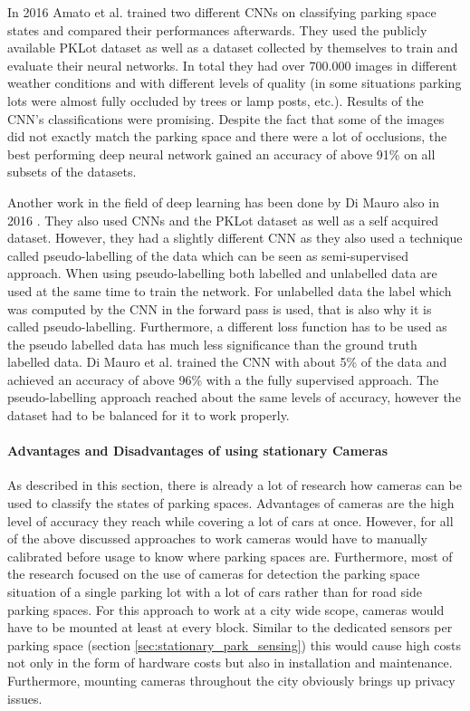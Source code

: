 In 2016 Amato et al. \cite{Amato2016} trained two different CNNs on classifying parking space states and compared their performances afterwards. They used the publicly available PKLot dataset as well as a dataset collected by themselves to train and evaluate their neural networks. In total they had over 700.000 images in different weather conditions and with different levels of quality (in some situations parking lots were almost fully occluded by trees or lamp posts, etc.). Results of the CNN's classifications were promising. Despite the fact that some of the images did not exactly match the parking space and there were a lot of occlusions, the best performing deep neural network gained an accuracy of above 91\% on all subsets of the datasets. 

Another work in the field of deep learning has been done by Di Mauro also in 2016 \cite{DiMauro2016}. They also used CNNs and the PKLot dataset as well as a self acquired dataset. However, they had a slightly different CNN as they also used a technique called pseudo-labelling of the data which can be seen as semi-supervised approach. When using pseudo-labelling both labelled and unlabelled data are used at the same time to train the network. For unlabelled data the label which was computed by the CNN in the forward pass is used, that is also why it is called pseudo-labelling. Furthermore, a different loss function has to be used as the pseudo labelled data has much less significance than the ground truth labelled data. Di Mauro et al. trained the CNN with about 5\% of the data and achieved an accuracy of above 96\% with a the fully supervised approach. The pseudo-labelling approach reached about the same levels of accuracy, however the dataset had to be balanced for it to work properly.


\paragraph{Advantages and Disadvantages of using stationary Cameras}

As described in this section, there is already a lot of research how cameras can be used to classify the states of parking spaces. Advantages of cameras are the high level of accuracy they reach while covering a lot of cars at once. However, for all of the above discussed approaches to work cameras would have to manually calibrated before usage to know where parking spaces are. Furthermore, most of the research focused on the use of cameras for detection the parking space situation of a single parking lot with a lot of cars rather than for road side parking spaces. For this approach to work at a city wide scope, cameras would have to be mounted at least at every block. Similar to the dedicated sensors per parking space (section \ref{sec:stationary_park_sensing}) this would cause high costs not only in the form of hardware costs but also in installation and maintenance. Furthermore, mounting cameras throughout the city obviously brings up privacy issues.





